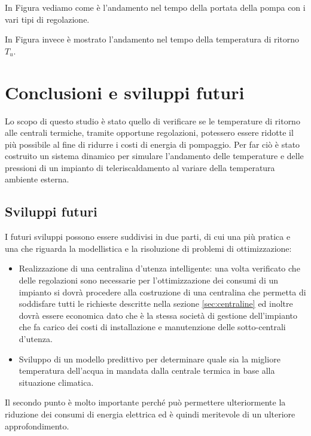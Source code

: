 \documentclass[laurea,oneside,11pt]{USiena_tesiLM}
\begin{document}
In Figura vediamo come è l'andamento nel tempo della portata della pompa con i vari tipi di regolazione. 

In Figura invece è mostrato l'andamento nel tempo della temperatura di ritorno $T_u$. 


\chapter{Conclusioni e sviluppi futuri}

Lo scopo di questo studio è stato quello di verificare se le temperature di ritorno alle centrali termiche, tramite opportune regolazioni, potessero essere ridotte il più possibile al fine di ridurre i costi di energia di pompaggio. Per far ciò è stato costruito un sistema dinamico per simulare l'andamento delle temperature e delle pressioni di un impianto di teleriscaldamento al variare della temperatura ambiente esterna. 

\section{Sviluppi futuri}
I futuri sviluppi possono essere suddivisi in due parti, di cui una più pratica e una che riguarda la modellistica e la risoluzione di problemi di ottimizzazione: 
\begin{itemize}
\item  Realizzazione di una centralina d'utenza intelligente: una volta verificato che delle regolazioni sono necessarie per l'ottimizzazione dei consumi di un impianto si dovrà procedere alla costruzione di una centralina che permetta di soddisfare tutti le richieste descritte nella sezione \ref{sec:centraline} ed inoltre dovrà essere economica dato che è la stessa società  di gestione dell'impianto che fa carico dei costi di installazione e manutenzione delle sotto-centrali d'utenza.
\item Sviluppo di un modello predittivo per determinare quale sia la migliore temperatura dell'acqua in mandata dalla centrale termica in base alla situazione climatica.
\end{itemize}
Il secondo punto è molto importante perché può permettere ulteriormente la riduzione dei consumi di energia elettrica ed è quindi meritevole di un ulteriore approfondimento. 
 
\end{document}

